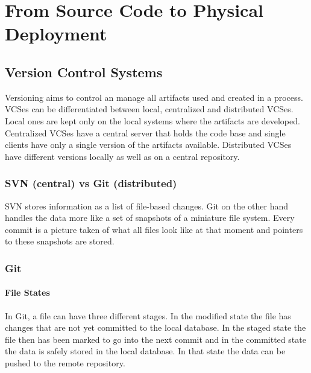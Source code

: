 
\section{From Source Code to Physical Deployment}

\subsection{Version Control Systems}
Versioning aims to control an manage all artifacts used and created in a process.
VCSes can be differentiated between local, centralized and distributed VCSes.
Local ones are kept only on the local systems where the artifacts are developed.
Centralized VCSes have a central server that holds the code base and single clients have only a single version of the artifacts available.
Distributed VCSes have different versions locally as well as on a central repository.

\subsubsection{SVN (central) vs Git (distributed)}
SVN stores information as a list of file-based changes.
Git on the other hand handles the data more like a set of snapshots of a miniature file system.
Every commit is a picture taken of what all files look like at that moment and pointers to these snapshots are stored.

\subsubsection{Git}
\paragraph{File States}
In Git, a file can have three different stages.
In the modified state the file has changes that are not yet committed to the local database.
In the staged state the file then has been marked to go into the next commit and in the committed state the data is safely stored in the local database.
In that state the data can be pushed to the remote repository.

